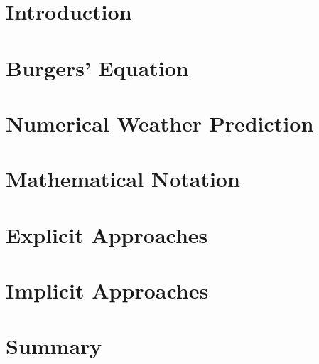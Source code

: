 %
%
%



\begin{frame}
\titlepage
\end{frame}

\section{Introduction}


\section{Burgers' Equation}


\section{Numerical Weather Prediction}


\section{Mathematical Notation}


\section{Explicit Approaches}


\section{Implicit Approaches}


\section{Summary}





